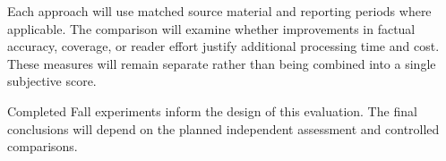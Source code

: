 Each approach will use matched source material and reporting periods where applicable. The comparison will examine whether improvements in factual accuracy, coverage, or reader effort justify additional processing time and cost. These measures will remain separate rather than being combined into a single subjective score.

Completed Fall experiments inform the design of this evaluation. The final conclusions will depend on the planned independent assessment and controlled comparisons.